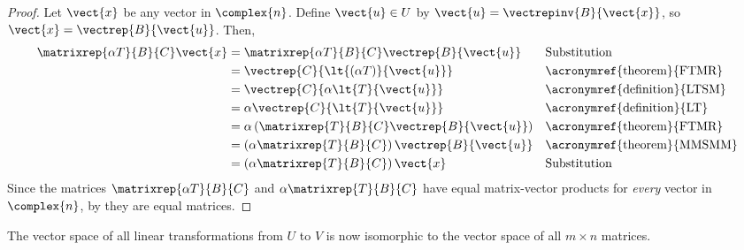 \begin{proof}
Let $\vect{x}$ be any vector in $\complex{n}$.  Define $\vect{u}\in U$ by $\vect{u}=\vectrepinv{B}{\vect{x}}$, so $\vect{x}=\vectrep{B}{\vect{u}}$.  Then,
%
\begin{align*}
\matrixrep{\alpha T}{B}{C}\vect{x}&=
\matrixrep{\alpha T}{B}{C}\vectrep{B}{\vect{u}}&&\text{Substitution}\\
&=\vectrep{C}{\lt{\left(\alpha T\right)}{\vect{u}}}&&\text{\acronymref{theorem}{FTMR}}\\
&=\vectrep{C}{\alpha\lt{T}{\vect{u}}}&&\text{\acronymref{definition}{LTSM}}\\
&=\alpha\vectrep{C}{\lt{T}{\vect{u}}}&&\text{\acronymref{definition}{LT}}\\
&=\alpha\left(\matrixrep{T}{B}{C}\vectrep{B}{\vect{u}}\right)&&\text{\acronymref{theorem}{FTMR}}\\
&=\left(\alpha\matrixrep{T}{B}{C}\right)\vectrep{B}{\vect{u}}&&\text{\acronymref{theorem}{MMSMM}}\\
&=\left(\alpha\matrixrep{T}{B}{C}\right)\vect{x}&&\text{Substitution}
\end{align*}
%
Since the matrices $\matrixrep{\alpha T}{B}{C}$ and $\alpha\matrixrep{T}{B}{C}$ have equal matrix-vector products for {\em every} vector in $\complex{n}$,  by  they are equal matrices.
%
\end{proof}
%

The vector space of all linear transformations from $U$ to $V$ is now isomorphic to the vector space of all $m\times n$ matrices.


